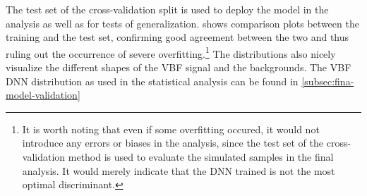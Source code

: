 
The test set of the cross-validation split is used to deploy the model in the analysis as well as for tests of generalization.
 shows comparison plots between the training and the test set, confirming good agreement between the two and thus ruling out the occurrence of severe overfitting.\footnote{It is worth noting that even if some overfitting occured, it would not introduce any errors or biases in the analysis, since the test set of the cross-validation method is used to evaluate the simulated samples in the final analysis. It would merely indicate that the DNN trained is not the most optimal discriminant.}
The distributions also nicely visualize the different shapes of the VBF signal and the backgrounds.
The VBF DNN distribution as used in the statistical analysis can be found in \cref{subsec:fina-model-validation}
\captionsetup[subfloat]{captionskip=7pt} %


